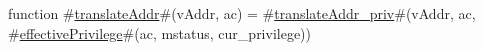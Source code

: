 function #\hyperref[sailRISCVztranslateAddr]{translateAddr}#(vAddr, ac) =
  #\hyperref[sailRISCVztranslateAddrzypriv]{translateAddr\_priv}#(vAddr, ac, #\hyperref[sailRISCVzeffectivePrivilege]{effectivePrivilege}#(ac, mstatus, cur_privilege))
